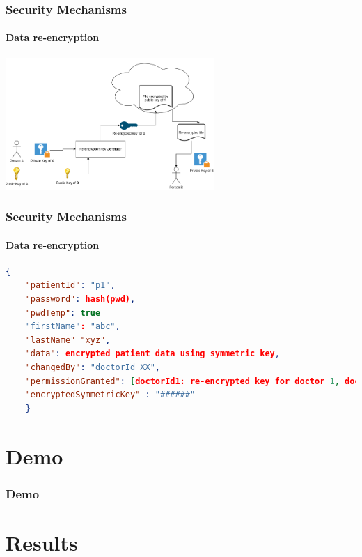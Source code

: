 \documentclass[english,hangout]{beamer}
\begin{document}
\begin{frame}[fragile]
 \frametitle{Security Mechanisms}
 \framesubtitle{Data re-encryption}
    \begin{center}
        \vspace{-1.2em}
            \includegraphics[height=5cm]{Re-encryption.png}
        \end{center}
        \vspace{-3mm}
\end{frame}

\begin{frame}[fragile]
 \frametitle{Security Mechanisms}
 \framesubtitle{Data re-encryption}
    \begin{lstlisting}[language=json,firstnumber=1]
    {
    "patientId": "p1",
    "password": hash(pwd),
    "pwdTemp": true
    "firstName": "abc",
    "lastName" "xyz",
    "data": encrypted patient data using symmetric key,
    "changedBy": "doctorId XX",
    "permissionGranted": [doctorId1: re-encrypted key for doctor 1, doctorId2: re-encrypted key for doctor 2, ...],
    "encryptedSymmetricKey" : "######"
    }    
    \end{lstlisting}
\end{frame}

\section{Demo}


\begin{frame}[fragile]
 \frametitle{Demo}
\end{frame}


\section{Results}
\end{document}
